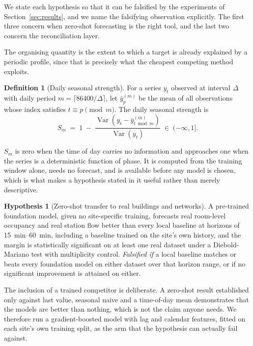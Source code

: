 \documentclass[11pt]{article}
\theoremstyle{plain}
\theoremstyle{definition}
\newtheorem{definition}[theorem]{Definition}
\newtheorem{hypothesis}{Hypothesis}
\theoremstyle{remark}
\begin{document}
We state each hypothesis so that it can be falsified by the experiments of Section~\ref{sec:results}, and we name the falsifying observation explicitly. The first three concern when zero-shot forecasting is the right tool, and the last two concern the reconciliation layer.

The organising quantity is the extent to which a target is already explained by a periodic profile, since that is precisely what the cheapest competing method exploits.

\begin{definition}[Daily seasonal strength]
\label{def:strength}
For a series $y_t$ observed at interval $\Delta$ with daily period $m = \lceil 86400/\Delta \rceil$, let $\bar{y}^{(m)}_{p}$ be the mean of all observations whose index satisfies $t \equiv p \pmod m$. The daily seasonal strength is
\begin{equation}
S_m \;=\; 1 \;-\; \frac{\operatorname{Var}\!\left(y_t - \bar{y}^{(m)}_{t \bmod m}\right)}{\operatorname{Var}(y_t)} \;\in\; (-\infty, 1].
\label{eq:strength}
\end{equation}
\end{definition}
$S_m$ is zero when the time of day carries no information and approaches one when the series is a deterministic function of phase. It is computed from the training window alone, needs no forecast, and is available before any model is chosen, which is what makes a hypothesis stated in it useful rather than merely descriptive.

\begin{hypothesis}[Zero-shot transfer to real buildings and networks]
\label{hyp:transfer}
A pre-trained foundation model, given no site-specific training, forecasts real room-level occupancy and real station flow better than every local baseline at horizons of \SIrange{15}{60}{\minute}, including a baseline trained on the site's own history, and the margin is statistically significant on at least one real dataset under a Diebold-Mariano test with multiplicity control.
\emph{Falsified if} a local baseline matches or beats every foundation model on either dataset over that horizon range, or if no significant improvement is attained on either.
\end{hypothesis}

The inclusion of a trained competitor is deliberate. A zero-shot result established only against last value, seasonal naive and a time-of-day mean demonstrates that the models are better than nothing, which is not the claim anyone needs. We therefore run a gradient-boosted model with lag and calendar features, fitted on each site's own training split, as the arm that the hypothesis can actually fail against.
\end{document}
